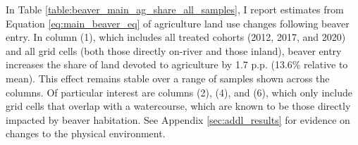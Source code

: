 In Table \ref{table:beaver_main_ag_share_all_samples}, I report estimates from Equation \ref{eq:main_beaver_eq} of agriculture land use changes following beaver entry. In column (1), which includes all treated cohorts (2012, 2017, and 2020) and all grid cells (both those directly on-river and those inland), beaver entry increases the share of land devoted to agriculture by 1.7 p.p. (13.6\% relative to mean). This effect remains stable over a range of samples shown across the columns. Of particular interest are columns (2), (4), and (6), which only include grid cells that overlap with a watercourse, which are known to be those directly impacted by beaver habitation. See Appendix \ref{sec:addl_results} for evidence on changes to the physical environment.


